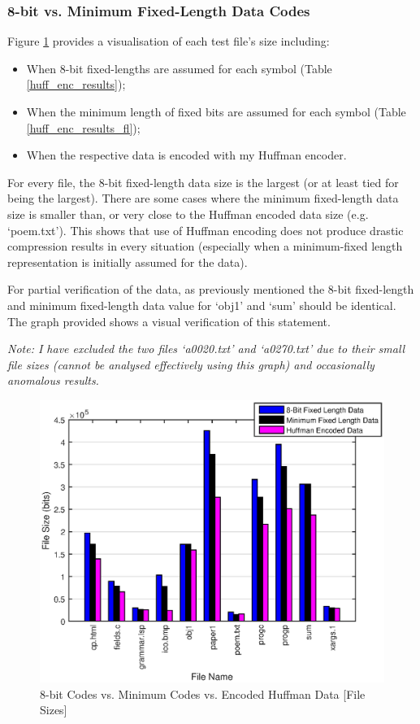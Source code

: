 \documentclass[12pt]{article}
\begin{document}
\subsubsection{8-bit vs. Minimum Fixed-Length Data Codes}
Figure \ref{fig:8bit_min_encoded_huffman} provides a visualisation of each test file's size including:

\begin{itemize}
	\item When 8-bit fixed-lengths are assumed for each symbol (Table \ref{huff_enc_results});
	\item When the minimum length of fixed bits are assumed for each symbol (Table \ref{huff_enc_results_fl});
	\item When the respective data is encoded with my Huffman encoder.
\end{itemize}

For every file, the 8-bit fixed-length data size is the largest (or at least tied for being the largest). There are some cases where the minimum fixed-length data size is smaller than, or very close to the Huffman encoded data size (e.g. `poem.txt'). This shows that use of Huffman encoding does not produce drastic compression results in every situation (especially when a minimum-fixed length representation is initially assumed for the data).

For partial verification of the data, as previously mentioned the 8-bit fixed-length and minimum fixed-length data value for `obj1' and `sum' should be identical. The graph provided shows a visual verification of this statement.

\emph{Note: I have excluded the two files `a0020.txt' and `a0270.txt' due to their small file sizes (cannot be analysed effectively using this graph) and occasionally anomalous results.}

\begin{figure}[H]
	\centering
	\includegraphics[width=\textwidth]{min_8bit_huffman_size}
	\caption{8-bit Codes vs. Minimum Codes vs. Encoded Huffman Data [File Sizes]}
	\label{fig:8bit_min_encoded_huffman}
\end{figure}
\end{document}
